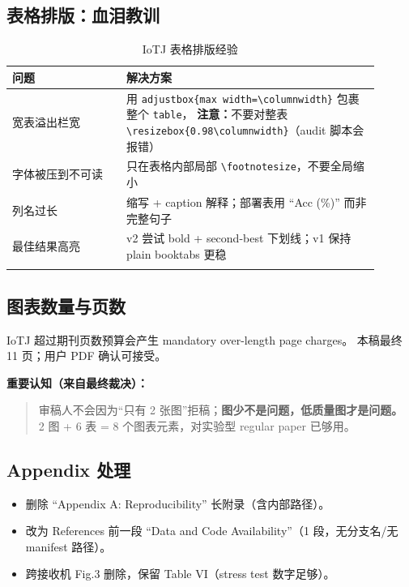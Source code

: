\documentclass[11pt,a4paper]{ctexart}
\newcommand{\warn}[1]{\textcolor{orange!80!black}{\textbf{注意：}#1}}
\begin{document}
\subsection{表格排版：血泪教训}
\begin{longtable}{@{}p{0.28\linewidth}p{0.62\linewidth}@{}}
  \toprule
  \textbf{问题} & \textbf{解决方案} \\
  \midrule
  \endhead
  宽表溢出栏宽 &
  用 \texttt{adjustbox\{max width=\textbackslash columnwidth\}} 包裹整个 \texttt{table}，
  \warn{不要}对整表 \texttt{\textbackslash resizebox\{0.98\textbackslash columnwidth\}}（audit 脚本会报错） \\
  字体被压到不可读 &
  只在表格内部局部 \texttt{\textbackslash footnotesize}，不要全局缩小 \\
  列名过长 &
  缩写 + caption 解释；部署表用 ``Acc (\%)'' 而非完整句子 \\
  最佳结果高亮 &
  v2 尝试 bold + second-best 下划线；v1 保持 plain booktabs 更稳 \\
  \bottomrule
  \caption{IoTJ 表格排版经验}
\end{longtable}

\subsection{图表数量与页数}
IoTJ 超过期刊页数预算会产生 mandatory over-length page charges。
本稿最终 11 页；用户 PDF 确认可接受。

\textbf{重要认知（来自最终裁决）：}
\begin{quote}
  审稿人不会因为``只有 2 张图''拒稿；\textbf{图少不是问题，低质量图才是问题。}\\
  2 图 + 6 表 = 8 个图表元素，对实验型 regular paper 已够用。
\end{quote}

\subsection{Appendix 处理}
\begin{itemize}
  \item 删除 ``Appendix A: Reproducibility'' 长附录（含内部路径）。
  \item 改为 References 前一段 ``Data and Code Availability''（1 段，无分支名/无 manifest 路径）。
  \item 跨接收机 Fig.3 删除，保留 Table VI（stress test 数字足够）。
\end{itemize}

\end{document}
